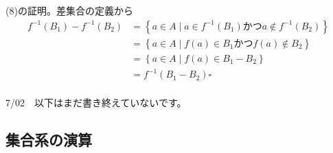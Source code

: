 \documentclass[a4j,dvipdfmx]{jsarticle}
\begin{document}
(8)の証明。差集合の定義から
\begin{align*}
    f^{-1}(B_1)-f^{-1}(B_2)
    &=\left\{a\in A\mid a\in f^{-1}(B_1) \text{かつ} a\notin f^{-1}(B_2)\right\}\\
    &=\left\{a\in A\mid f(a)\in B_1 \text{かつ} f(a)\notin B_2\right\}\\
    &=\left\{a\in A\mid f(a)\in B_1-B_2\right\}\\
    &=f^{-1}(B_1-B_2)\square
\end{align*}
\color{black}
\hrulefill\\
7/02　以下はまだ書き終えていないです。
\newpage
\subsection{集合系の演算}
\end{document}
